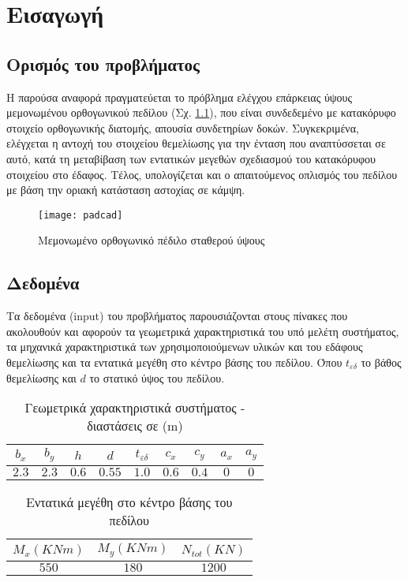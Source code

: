 \pagestyle{fancy}
\chapter{Εισαγωγή}
\section{Ορισμός του προβλήματος}
Η παρούσα αναφορά πραγματεύεται το πρόβλημα ελέγχου επάρκειας ύψους μεμονωμένου ορθογωνικού πεδίλου (Σχ. \ref{fig:pad}), που είναι συνδεδεμένο με κατακόρυφο στοιχείο ορθογωνικής διατομής, απουσία συνδετηρίων δοκών. Συγκεκριμένα, ελέγχεται η αντοχή του στοιχείου θεμελίωσης για την ένταση που αναπτύσσεται σε αυτό, κατά τη μεταβίβαση των εντατικών μεγεθών σχεδιασμού του κατακόρυφου στοιχείου στο έδαφος. Τέλος, υπολογίζεται και ο απαιτούμενος οπλισμός του πεδίλου με βάση την οριακή κατάσταση αστοχίας σε κάμψη.

\begin{figure}[H]
	\centering
	\texttt{[image: padcad]}
	\caption{Μεμονωμένο ορθογωνικό πέδιλο σταθερού ύψους}
	\label{fig:pad}
\end{figure}

\section{Δεδομένα}
Τα δεδομένα (\textlatin{input}) του προβλήματος παρουσιάζονται στους πίνακες που ακολουθούν και αφορούν τα γεωμετρικά χαρακτηριστικά του υπό μελέτη συστήματος, τα μηχανικά χαρακτηριστικά των χρησιμοποιούμενων υλικών και του εδάφους θεμελίωσης και τα εντατικά μεγέθη στο κέντρο βάσης του πεδίλου. Όπου $t_{\varepsilon\delta}$ το βάθος θεμελίωσης και $d$ το στατικό ύψος του πεδίλου.
\begin{table}[H]
\en
\centering
\begin{tabular}{| c | c | c | c | c | c | c | c | c |}
\hline
$b_x$ & $b_y$ & $h$ & $d$ & $t_{\varepsilon\delta}$ & $c_x$ & $c_y$ & $a_x$ & $a_y$ \\
\hline
$2.3$ & $2.3$ & $0.6$ & $0.55$ & $1.0$ & $0.6$ & $0.4$ & $0$ & $0$ \\
\hline
\end{tabular}
\el
\caption{Γεωμετρικά χαρακτηριστικά συστήματος - διαστάσεις σε (\textlatin{m})}
\label{tab:geometry}
\end{table}

\begin{table}[H]
\en
\centering
\begin{tabular}{| c | c | c |}
\hline
$M_x(KNm)$ & $M_y(KNm)$ & $N_{tot}(KN)$ \\
\hline
$550$ & $180$ & $1200$ \\
\hline
\end{tabular}
\el
\caption{Εντατικά μεγέθη στο κέντρο βάσης του πεδίλου}
\end{table}

